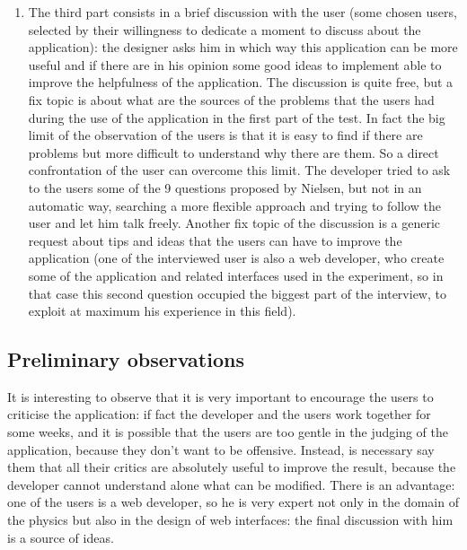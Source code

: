 \begin{enumerate}
\item 
The third part consists in a brief discussion with the user (some chosen users, selected by their willingness to dedicate a moment to discuss about the application): the designer asks him in which way this application can be more useful and if there are in his opinion some good ideas to implement able to improve the helpfulness of the application. The discussion is quite free, but a fix topic is about what are the sources of the problems that the users had during the use of the application in the first part of the test. In fact the big limit of the observation of the users is that it is easy to find if there are problems but more difficult to understand why there are them. So a direct confrontation of the user can overcome this limit. 
The developer tried to ask to the users some of the 9 questions proposed by Nielsen, but not in an automatic way, searching a more flexible approach and trying to follow the user and let him talk freely.
Another fix topic of the discussion is a generic request about tips and ideas that the users can have to improve the application (one of the interviewed user is also a web developer, who create some of the application and related interfaces used in the experiment, so in that case this second question occupied the biggest part of the interview, to exploit at maximum his experience in this field). 

\end{enumerate} 

\subsection{Preliminary observations}
It is interesting to observe that it is very important to encourage the users to criticise the application: if fact the developer and the users work together for some weeks, and it is possible that the users are too gentle in the judging of the application, because they don't want to be offensive. Instead, is necessary say them that all their critics are absolutely useful to improve the result, because the developer cannot understand alone what can be modified. 
There is an advantage: one of the users is a web developer, so he is very expert not only in the domain of the physics but also in the design of web interfaces: the final discussion with him is a source of ideas.  

